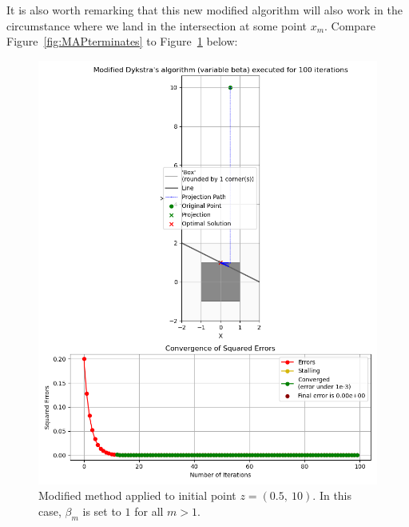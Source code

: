 \documentclass[hidelinks]{article}
\begin{document}
%
\newpage
It is also worth remarking that this new modified algorithm will also work in the circumstance where we land in the intersection at some point $x_m$. Compare Figure~\ref{fig:MAPterminates} to Figure~\ref{fig:noTermination} below:
%
\begin{figure}[h!]
    \centering
    
    \includegraphics[width=1\textwidth]{Latex/Current Version/Figures/in_intersection_modified.png}
    \caption{Modified method applied to initial point $z = (0.5,~10)$. In this case, $\beta_m$ is set to $1$ for all $m > 1$.}
    \label{fig:noTermination}

\end{figure}
%
\end{document}
